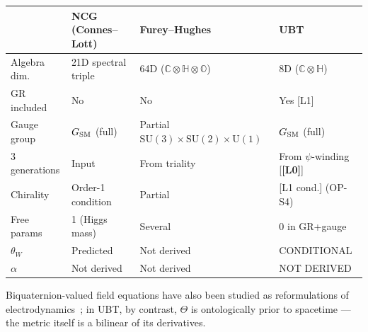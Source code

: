 \documentclass[12pt,a4paper]{article}
\theoremstyle{definition}
\theoremstyle{remark}
\newcommand{\SU}[1]{\mathrm{SU}(#1)}
\newcommand{\UU}[1]{\mathrm{U}(#1)}
\newcommand{\Lzero}{\textbf{[L0]}}
\begin{document}
\begin{center}
\begin{tabular}{llll}
\toprule
& \textbf{NCG (Connes--Lott)} & \textbf{Furey--Hughes} & \textbf{UBT} \\
\midrule
Algebra dim. & 21D spectral triple & 64D ($\mathbb{C}\otimes\mathbb{H}\otimes\mathbb{O}$) & 8D ($\mathbb{C}\otimes\mathbb{H}$) \\
GR included & No & No & Yes [L1] \\
Gauge group & $G_{\rm SM}$ (full) & Partial $\SU{3}\times\SU{2}\times\UU{1}$ & $G_{\rm SM}$ (full) \\
3 generations & Input & From triality & From $\psi$-winding [\Lzero] \\
Chirality & Order-1 condition & Partial & [L1 cond.] (OP-S4) \\
Free params & 1 (Higgs mass) & Several & 0 in GR+gauge \\
$\theta_W$ & Predicted & Not derived & CONDITIONAL \\
$\alpha$ & Not derived & Not derived & NOT DERIVED \\
\bottomrule
\end{tabular}
\end{center}

Biquaternion-valued field equations have also been studied as reformulations of
electrodynamics~\cite{kassandrov1995}; in UBT, by contrast, $\Theta$ is
ontologically prior to spacetime --- the metric itself is a bilinear of its
derivatives.



\end{document}
